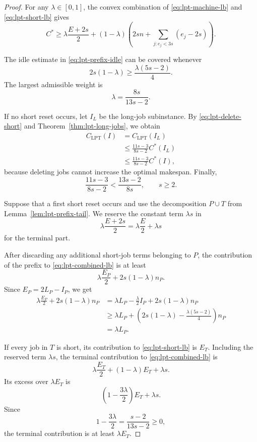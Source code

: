 \documentclass[11pt]{article}
\begin{document}
\begin{proof}
For any \(\lambda\in[0,1]\), the convex combination of
\eqref{eq:lpt-machine-lb} and \eqref{eq:lpt-short-lb} gives
\begin{equation}
C^*
\ge
\lambda\frac{E+2s}{2}
+
(1-\lambda)
\left(
2sn+\sum_{j:e_j<3s}(e_j-2s)
\right).
\label{eq:lpt-combined-lb}
\end{equation}

The idle estimate in \eqref{eq:lpt-prefix-idle} can be covered whenever
\[
2s(1-\lambda)
\ge
\frac{\lambda(5s-2)}{4}.
\]
The largest admissible weight is
\begin{equation}
\lambda=\frac{8s}{13s-2}.
\label{eq:lpt-weight}
\end{equation}

If no short reset occurs, let \(I_L\) be the long-job subinstance. By
\eqref{eq:lpt-delete-short} and Theorem~\ref{thm:lpt-long-jobs}, we obtain 
\[
\begin{aligned}
C_{\mathrm{LPT}}(I)
&=C_{\mathrm{LPT}}(I_L)\\
&\le\frac{11s-3}{8s-2}C^*(I_L)\\
&\le\frac{11s-3}{8s-2}C^*(I),
\end{aligned}
\]
because deleting jobs cannot increase the optimal makespan. Finally,
\[
\frac{11s-3}{8s-2}<\frac{13s-2}{8s},
\qquad s\ge2.
\]

Suppose that a first short reset occurs and use the decomposition \(P\cup T\)
from Lemma~\ref{lem:lpt-prefix-tail}. We reserve the constant term
\(\lambda s\) in
\[
\lambda\frac{E+2s}{2}=\lambda\frac E2+\lambda s
\]
for the terminal part.

After discarding any additional short-job terms belonging to \(P\), the
contribution of the prefix to \eqref{eq:lpt-combined-lb} is at least
\[
\lambda\frac{E_P}{2}+2s(1-\lambda)n_P.
\]
Since \(E_P=2L_P-I_P\), we get 
\begin{equation}
\begin{aligned}
\lambda\frac{E_P}{2}+2s(1-\lambda)n_P
&=\lambda L_P-\frac{\lambda}{2}I_P
  +2s(1-\lambda)n_P\\
&\ge
\lambda L_P+
\left(
2s(1-\lambda)-\frac{\lambda(5s-2)}4
\right)n_P\\
&=\lambda L_P.
\end{aligned}
\label{eq:lpt-prefix-payment}
\end{equation}

If every job in \(T\) is short, its contribution to
\eqref{eq:lpt-short-lb} is \(E_T\). Including the reserved term \(\lambda s\),
the terminal contribution to \eqref{eq:lpt-combined-lb} is
\[
\lambda\frac{E_T}{2}+(1-\lambda)E_T+\lambda s.
\]
Its excess over \(\lambda E_T\) is
\[
\left(1-\frac{3\lambda}{2}\right)E_T+\lambda s.
\]
Since
\[
1-\frac{3\lambda}{2}=\frac{s-2}{13s-2}\ge0,
\]
the terminal contribution is at least \(\lambda E_T\).


\end{proof}
\end{document}
